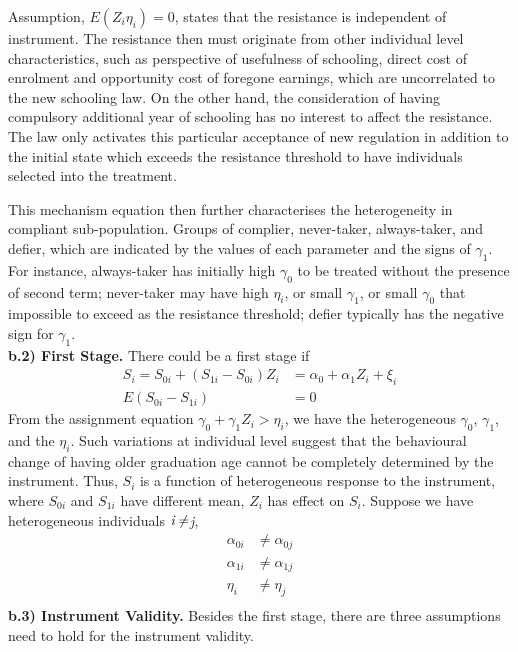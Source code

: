 \documentclass[a4paper,12pt,oneside,English]{article}
\begin{document}
Assumption, \( E(Z_i \eta _i) = 0\), states that the resistance is independent of instrument. The resistance then must originate from other individual level characteristics, such as perspective of usefulness of schooling, direct cost of enrolment and opportunity cost of foregone earnings, which are uncorrelated to the new schooling law. On the other hand, the consideration of having compulsory additional year of schooling has no interest to affect the resistance. The law only activates this particular acceptance of new regulation in addition to the initial state which exceeds the resistance threshold to have individuals selected into the treatment. 

This mechanism equation then further characterises the heterogeneity in compliant sub-population.  Groups of complier, never-taker, always-taker, and defier, which are indicated by the values of each parameter and the signs of $\gamma_1$. For instance, always-taker has initially high $\gamma_0$ to be treated without the presence of second term; never-taker may have high $\eta_i$, or small $\gamma_1$, or small $\gamma_0$ that impossible to exceed as the resistance threshold; defier typically has the negative sign for $\gamma_1$.\\

\textbf{b.2) First Stage.} 
There could be a first stage if 
\begin{align}
  S_i =S_{0i}+(S_{1i}-S_{0i})Z_i &=\alpha_0 + \alpha_1 Z_i + \xi_i \\
E(S_{0i}-S_{1i}) &= 0  
\end{align}
From the assignment equation \(\gamma_0+ \gamma_1 Z_i > \eta_i\), we have the heterogeneous $\gamma_0$, $\gamma_1$, and the $\eta_i$. Such variations at individual level suggest that the behavioural change of having older graduation age cannot be completely determined by the instrument. Thus, ${S_i}$ is a function of heterogeneous response to the instrument, where $S_{0i}$ and $S_{1i}$ have different mean, $Z_i$ has effect on $S_i$. Suppose we have heterogeneous individuals $\emph{i} \not= $\emph{j},
\begin{align*}
  \alpha_{0i} & \not= \alpha_{0j} \\
  \alpha_{1i} & \not= \alpha_{1j} \\
  \eta_i & \not= \eta_j \\
\end{align*}
\textbf{b.3) Instrument Validity.}
Besides the first stage, there are three assumptions need to hold for the instrument validity.
\end{document}
